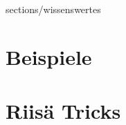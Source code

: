 \newcommand{\titleinfo}{Wechsel- \& Drehstromtechnik - HS2019}
\newcommand{\authorinfo}{Ben-Ji \& Atomjoggeli, Braun \& Co, J.Rast, S.K\"orner, C.Gwerder, M. Giger}









\newpage

 {sections/wissenswertes}

\newpage
\section{Beispiele}


\newpage









\newpage
\section{Riis\"a Tricks}






